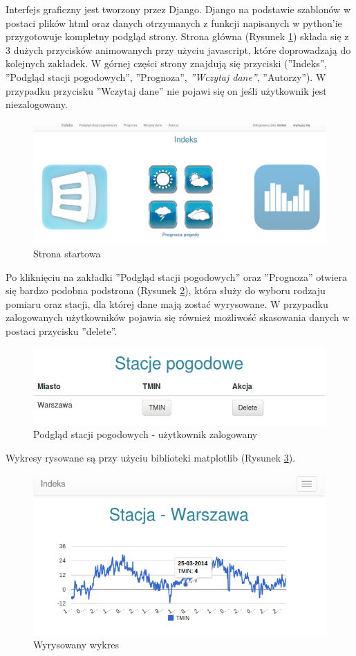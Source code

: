 Interfejs graficzny jest tworzony przez Django. Django na podstawie szablonów w postaci plików html oraz danych otrzymanych z funkcji napisanych w python'ie przygotowuje kompletny podgląd strony. 
Strona główna (Rysunek \ref{fig:stronaStartowa}) składa się z 3 dużych przycisków animowanych przy użyciu javascript, które doprowadzają do kolejnych zakładek. W górnej części strony znajdują się przyciski (''Indeks'', ''Podgląd stacji pogodowych'', ''Prognoza'', \textit{''Wczytaj dane''}, ''Autorzy''). W przypadku przycisku ''Wczytaj dane'' nie pojawi się on jeśli użytkownik jest niezalogowany. \newline 
\begin{figure}[p]
	\centering
	\includegraphics[width=\textheight, angle=90]{000}
	\caption{Strona startowa}
	\label{fig:stronaStartowa}
	\end{figure}

Po kliknięciu na zakładki ''Podgląd stacji pogodowych'' oraz ''Prognoza'' otwiera się bardzo podobna podstrona (Rysunek \ref{fig:podgladStacji}), która służy do wyboru rodzaju pomiaru oraz stacji, dla której dane mają zostać wyrysowane. W przypadku zalogowanych użytkowników pojawia się również możliwość skasowania danych w postaci przycisku ''delete''. 
\newline
\begin{figure}[p]
	\centering
	\includegraphics[width=\linewidth]{001}
	\caption{Podgląd stacji pogodowych - użytkownik zalogowany}
	\label{fig:podgladStacji}
	\end{figure}

Wykresy rysowane są przy użyciu biblioteki matplotlib (Rysunek \ref{fig:wykres}). 
\newline
\begin{figure}[p]
	\centering
	\includegraphics[width=\linewidth]{002}
	\caption{Wyrysowany wykres}
	\label{fig:wykres}
	\end{figure}

